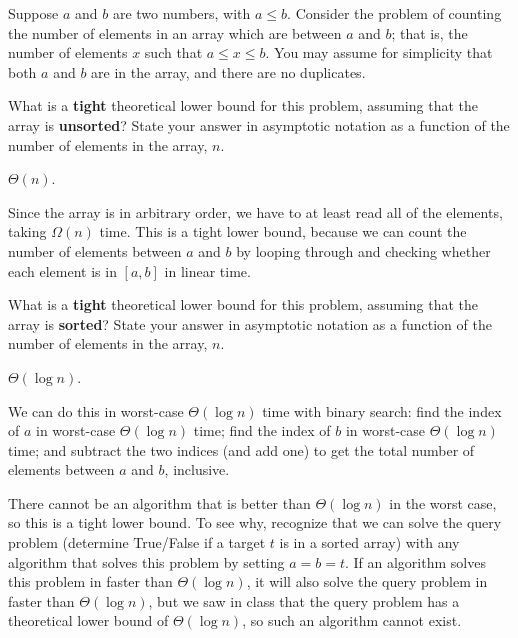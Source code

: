 \begin{prob}
    Suppose $a$ and $b$ are two numbers, with $a \leq b$.
    Consider the problem of counting the number of elements in an array which
    are between $a$ and $b$; that is, the number of elements $x$ such that $a
    \leq x \leq b$. You may assume for simplicity that both $a$ and $b$ are in the array,
    and there are no duplicates.

    \begin{subprobset}
        \begin{subprob}
            What is a \textbf{tight} theoretical lower bound for this problem, assuming that
            the array is \textbf{unsorted}? State your answer in asymptotic notation as a function
            of the number of elements in the array, $n$.

            \begin{soln}
                $\Theta(n)$.

                Since the array is in arbitrary order, we have to at least read all
                of the elements, taking $\Omega(n)$ time. This is a tight lower bound,
                because we can count the number of elements between $a$ and $b$ by
                looping through and checking whether each element is in $[a, b]$
                in linear time.
            \end{soln}
        \end{subprob}

        \begin{subprob}
            What is a \textbf{tight} theoretical lower bound for this problem, assuming that
            the array is \textbf{sorted}? State your answer in asymptotic notation as a function
            of the number of elements in the array, $n$.

            \begin{soln}
                $\Theta(\log n)$.

                We can do this in worst-case $\Theta(\log n)$ time with binary search:
                find the index of $a$ in worst-case $\Theta(\log n)$ time;
                find the index of $b$ in worst-case $\Theta(\log n)$ time;
                and subtract the two indices (and add one) to get the total number
                of elements between $a$ and $b$, inclusive.

                There cannot be an algorithm that is better than $\Theta(\log n)$
                in the worst case, so this is a tight lower bound. To see why, recognize
                that we can solve the query problem (determine True/False if a target $t$
                is in a sorted array) with any algorithm that solves this problem by
                setting $a = b = t$. If an algorithm solves this problem in faster than
                $\Theta(\log n)$, it will also solve the query problem in faster than
                $\Theta(\log n)$, but we saw in class that the query problem has a theoretical
                lower bound of $\Theta(\log n)$, so such an algorithm cannot exist.
            \end{soln}


\end{subprob}
\end{subprobset}
\end{prob}
